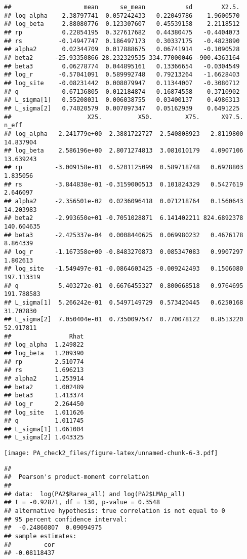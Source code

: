 \documentclass[12pt,]{article}
\begin{document}
\begin{verbatim}
##                    mean      se_mean           sd        X2.5.
## log_alpha    2.38797741  0.057242433   0.22049786    1.9600570
## log_beta     2.88080776  0.123307607   0.45539158    2.2118512
## rp           0.22854195  0.327617682   0.44380475   -0.4404073
## rs          -0.14947747  0.186497173   0.30337175   -0.4823890
## alpha2       0.02344709  0.017888675   0.06741914   -0.1090528
## beta2      -25.93350866 28.232329535 334.77000046 -900.4363164
## beta3        0.06278774  0.044895161   0.13366654   -0.0304549
## log_r       -0.57041091  0.589992748   0.79213264   -1.6628403
## log_site    -0.08231442  0.008079947   0.11344007   -0.3080712
## q            0.67136805  0.012184874   0.16874558    0.3710902
## L_sigma[1]   0.55208031  0.006038755   0.03400137    0.4986313
## L_sigma[2]   0.74020579  0.007097347   0.05162939    0.6491225
##                     X25.          X50.         X75.      X97.5.      n_eff
## log_alpha   2.241779e+00  2.3881722727  2.540808923   2.8119800  14.837904
## log_beta    2.586196e+00  2.8071274813  3.081010179   4.0907106  13.639243
## rp         -3.009158e-01  0.5201125099  0.589718748   0.6928803   1.835056
## rs         -3.844838e-01 -0.3159000513  0.101824329   0.5427619   2.646097
## alpha2     -2.356501e-02  0.0236096418  0.071218764   0.1560643  14.203983
## beta2      -2.993650e+01 -0.7051028871  6.141402211 824.6892378 140.604635
## beta3      -2.425337e-04  0.0008440625  0.069980232   0.4676178   8.864339
## log_r      -1.167358e+00 -0.8483270873  0.085347083   0.9907297   1.802613
## log_site   -1.549497e-01 -0.0864603425 -0.009242493   0.1506080 197.113319
## q           5.403272e-01  0.6676455327  0.800668518   0.9764695 191.788583
## L_sigma[1]  5.266242e-01  0.5497149729  0.573420445   0.6250168  31.702830
## L_sigma[2]  7.050404e-01  0.7350097547  0.770078122   0.8513220  52.917811
##                Rhat
## log_alpha  1.249822
## log_beta   1.209390
## rp         2.510774
## rs         1.696213
## alpha2     1.253914
## beta2      1.002489
## beta3      1.413374
## log_r      2.264450
## log_site   1.011626
## q          1.011745
## L_sigma[1] 1.061004
## L_sigma[2] 1.043325
\end{verbatim}

\texttt{[image: PA\_check2\_files/figure-latex/unnamed-chunk-6-3.pdf]}

\begin{verbatim}
## 
##  Pearson's product-moment correlation
## 
## data:  log(PA2$Rarea_all) and log(PA2$LMAp_all)
## t = -0.92871, df = 130, p-value = 0.3548
## alternative hypothesis: true correlation is not equal to 0
## 95 percent confidence interval:
##  -0.24860807  0.09094975
## sample estimates:
##         cor 
## -0.08118437
\end{verbatim}
\end{document}
